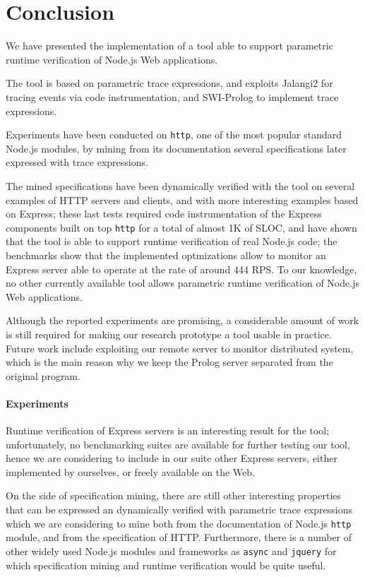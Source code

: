 \section{Conclusion}
\label{sec:conclu}

We have presented the implementation of a tool able to support
parametric runtime verification of Node.js Web applications.

The tool is based on parametric trace expressions, and exploits Jalangi2 for tracing events via code instrumentation, and SWI-Prolog to
implement trace expressions.

Experiments have been conducted on \lstinline{http}, one of the most popular standard Node.js modules,
by mining from its documentation several specifications later expressed with trace expressions.

The mined specifications have been dynamically verified with the tool on several examples of HTTP servers and clients,
and with more interesting examples based on Express; these last tests required code instrumentation of the Express components
built on top \lstinline{http} for a total of almost 1K of SLOC, and have shown that the tool is able to support
runtime verification of real Node.js code; the benchmarks show that the implemented optmizations allow to monitor
an Express server able to operate at the rate of around 444 RPS.
To our knowledge, no other currently available tool allows parametric runtime verification of Node.js Web applications.

Although the reported experiments are promising, a considerable amount of work is still required for making our research prototype a tool usable in practice.
Future work include exploiting our remote server to monitor distributed system, which is the main reason why we keep the Prolog server separated from the original program.

\paragraph{Experiments}
Runtime verification of Express servers is an interesting result for the tool; unfortunately,
no benchmarking suites are available for further testing our tool, hence we are
considering to include in our suite other Express servers, either implemented by ourselves,
or freely available on the Web.

On the side of specification mining, there are still other interesting properties that can be expressed an dynamically
verified with parametric trace expressions which we are considering to mine both from the documentation of Node.js
\lstinline{http} module, and from the specification of HTTP. Furthermore, there is a number of other widely used Node.js
modules and frameworks as \lstinline{async} and \lstinline{jquery} for which specification mining and runtime
verification would be quite useful.


